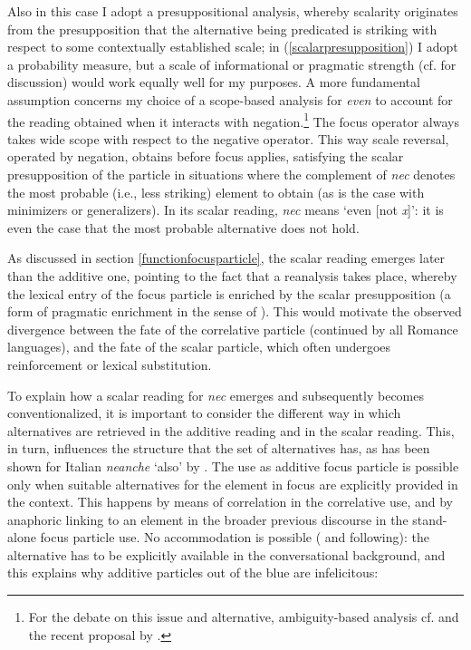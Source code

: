 \documentclass[output=paper,modfonts,nonflat,citecolor=brown,
showindex
]{langsci/langscibook}
\begin{document}
\noindent Also in this case I adopt a presuppositional analysis, whereby scalarity originates from the presupposition that the alternative being predicated is striking with respect to some contextually established scale; in (\ref{scalarpresupposition}) I adopt a probability measure, but a scale of informational or pragmatic strength (cf. \citealt{GastAuwera11} for discussion) would work equally well for my purposes. A more fundamental assumption concerns my choice of a scope-based analysis for {\emph{even}} to account for the reading obtained when it interacts with negation.{\footnote{For the debate on this issue and alternative, ambiguity-based analysis cf. \citet[]{Rooth85} and the recent proposal by \citet[]{Collins16}.}} The focus operator always takes wide scope with respect to the negative operator. This way scale reversal, operated by negation, obtains before focus applies, satisfying the scalar presupposition of the particle in situations where the complement of {\emph{nec}} denotes the most probable (i.e., less striking) element to obtain (as is the case with minimizers or generalizers). In its scalar reading, {\emph{nec}} means `even [not {\emph{x}}]': it is even the case that the most probable alternative does not hold.

As discussed in section \ref{functionfocusparticle}, the scalar reading emerges later than the additive one, pointing to the fact that a reanalysis takes place, whereby the lexical entry of the focus particle is enriched by the scalar presupposition (a form of pragmatic enrichment in the sense of \citealt{TraugottDasher02}). This would motivate the observed divergence between the fate of the correlative particle (continued by all Romance languages), and the fate of the scalar particle, which often undergoes reinforcement or lexical substitution.

To explain how a scalar reading for {\emph{nec}} emerges and subsequently becomes conventionalized, it is important to consider the different way in which alternatives are retrieved in the additive reading and in the scalar reading. This, in turn, influences the structure that the set of alternatives has, as has been shown for Italian {\emph{neanche}} `also' by \citet{Tovena06}. The use as additive focus particle is possible only when suitable alternatives for the element in focus are explicitly provided in the context. This happens by means of correlation in the correlative use, and by anaphoric linking to an element in the broader previous discourse in the stand-alone focus particle use. No accommodation is possible (\citealt[]{Zeevat92} and following): the alternative has to be explicitly available in the conversational background, and this explains why additive particles out of the blue are infelicitous:
\end{document}
